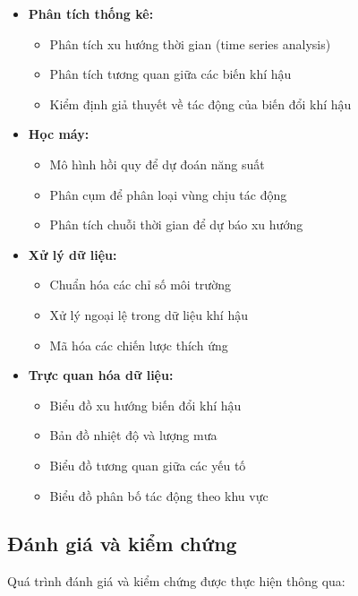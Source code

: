 \begin{itemize}
    \item \textbf{Phân tích thống kê:}
    \begin{itemize}
        \item Phân tích xu hướng thời gian (time series analysis)
        \item Phân tích tương quan giữa các biến khí hậu
        \item Kiểm định giả thuyết về tác động của biến đổi khí hậu
    \end{itemize}
    
    \item \textbf{Học máy:}
    \begin{itemize}
        \item Mô hình hồi quy để dự đoán năng suất
        \item Phân cụm để phân loại vùng chịu tác động
        \item Phân tích chuỗi thời gian để dự báo xu hướng
    \end{itemize}
    
    \item \textbf{Xử lý dữ liệu:}
    \begin{itemize}
        \item Chuẩn hóa các chỉ số môi trường
        \item Xử lý ngoại lệ trong dữ liệu khí hậu
        \item Mã hóa các chiến lược thích ứng
    \end{itemize}
    
    \item \textbf{Trực quan hóa dữ liệu:}
    \begin{itemize}
        \item Biểu đồ xu hướng biến đổi khí hậu
        \item Bản đồ nhiệt độ và lượng mưa
        \item Biểu đồ tương quan giữa các yếu tố
        \item Biểu đồ phân bố tác động theo khu vực
    \end{itemize}
\end{itemize}

\subsection{Đánh giá và kiểm chứng}

\hspace{0.5cm}Quá trình đánh giá và kiểm chứng được thực hiện thông qua:

